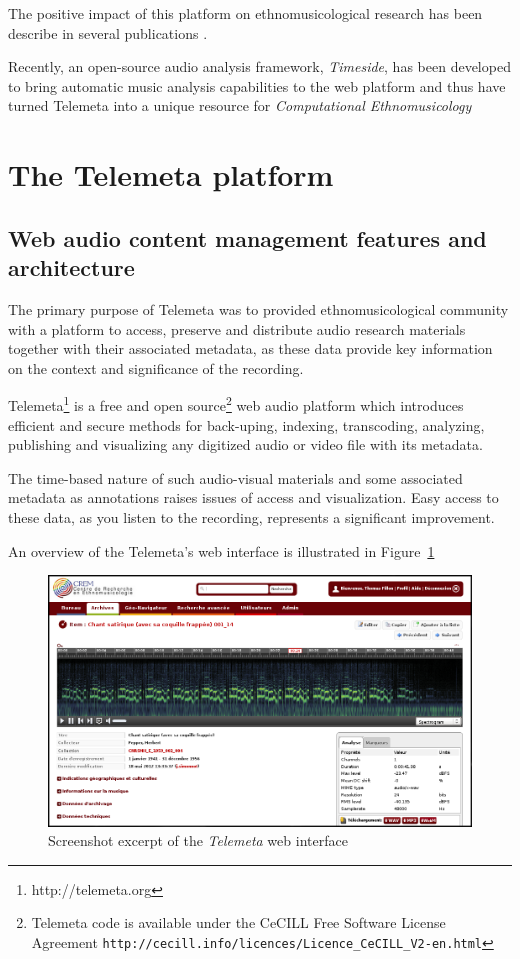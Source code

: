 \documentclass{paper}
\begin{document}
The positive impact of this platform on ethnomusicological research has been describe in several publications \cite{Simmonot_IASA_2011, Julien_IASA_2011, Simonnot_ICTM_2014}.

Recently, an open-source audio analysis framework, \emph{Timeside}, has been developed to bring automatic music analysis capabilities to the web platform and thus have turned Telemeta into a unique resource for \emph{Computational Ethnomusicology} \cite{Tzanetakis_2007_JIMS, Gomez_JNMR_2013}

 \section{The Telemeta platform}\label{sec:Telemeta}
 \subsection{Web audio content management features and architecture}
The primary purpose of Telemeta was to provided ethnomusicological community with a platform to access, preserve and distribute audio research materials together with their associated metadata, as these data provide key information on the context and significance of the recording.

 Telemeta\footnote{http://telemeta.org} is a free and open source\footnote{Telemeta code is available under the CeCILL Free Software License Agreement \texttt{http://cecill.info/licences/Licence\_CeCILL\_V2-en.html}} web audio platform which introduces efficient and secure methods for back-uping, indexing, transcoding, analyzing, publishing and visualizing any digitized audio or video file with its metadata.

The time-based nature of such audio-visual materials and some associated metadata as annotations raises issues of access and visualization. Easy access to these data, as you listen to the recording, represents a significant improvement.

 An overview of the Telemeta's web interface is illustrated in Figure~\ref{fig:Telemeta}
 \begin{figure}
   \centering
   \includegraphics[width=0.95\linewidth]{img/telemeta.png}
   \caption[1]{Screenshot excerpt of the \emph{Telemeta} web interface}
    \label{fig:Telemeta}
 \end{figure}
\end{document}
